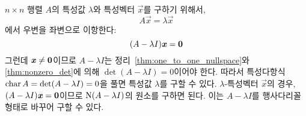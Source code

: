 \documentclass[sections/engineering_mathematics_lecture_note.tex]{subfiles}
\begin{document}
\begin{remark}
    $n \times n$ 행렬 $A$의 특성값 $\lambda$와 특성벡터 $\vec x$를 구하기 위해서,
    \begin{equation*}
        A \vec x = \lambda \vec x
    \end{equation*}
    에서 우변을 좌변으로 이항한다:
    \begin{equation*}
        (A - \lambda I) \bm{\mathit{x}} = \bm{\mathrm{0}}
    \end{equation*}
    그런데 $\bm{\mathit{x}} \neq \bm{\mathrm{0}}$이므로 $A - \lambda I$는 정리~\ref{thm:one_to_one_nullspace}와 \ref{thm:nonzero_det}에 의해 $\det (A - \lambda I) = 0$이어야 한다.
    따라서 특성다항식 $\operatorname{char} A = \det (A - \lambda I) = 0$을 풀면 특성값 $\lambda$를 구할 수 있다.
    $\lambda$-특성벡터 $\vec x$의 경우, $(A - \lambda I) \bm{\mathit{x}} = \bm{\mathrm{0}}$이므로 $\operatorname{N} (A - \lambda I)$의 원소를 구하면 된다.
    이는 $A - \lambda I$를 행사다리꼴 형태로 바꾸어 구할 수 있다.
\end{remark}
\end{document}
